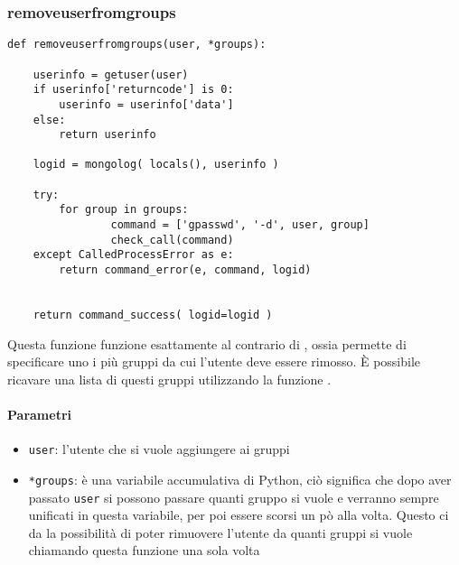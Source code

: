 \documentclass[11pt]{article}
\begin{document}
\subsubsection{removeuserfromgroups}\label{removeuserfromgroups}
\begin{lstlisting}
def removeuserfromgroups(user, *groups):

    userinfo = getuser(user)
    if userinfo['returncode'] is 0:
        userinfo = userinfo['data']
    else:
        return userinfo

    logid = mongolog( locals(), userinfo )
    
    try:
    	for group in groups:
                command = ['gpasswd', '-d', user, group]
                check_call(command)
    except CalledProcessError as e:
        return command_error(e, command, logid)
    
    
    return command_success( logid=logid )
\end{lstlisting}
Questa funzione funzione esattamente al contrario di , ossia permette di specificare
uno i più gruppi da cui l'utente deve essere rimosso. È possibile ricavare una lista di questi gruppi
utilizzando la funzione .
\paragraph{Parametri}
\begin{itemize}
	\item{\texttt{user}: l'utente che si vuole aggiungere ai gruppi}
	\item{\texttt{*groups}: è una variabile accumulativa di Python, ciò significa che
		dopo aver passato \texttt{user} si possono passare quanti gruppo si vuole e verranno sempre unificati
		in questa variabile, per poi essere scorsi un pò alla volta. Questo ci da la possibilità di poter
		rimuovere l'utente da quanti gruppi si vuole chiamando questa funzione una sola volta}
\end{itemize}
\end{document}
